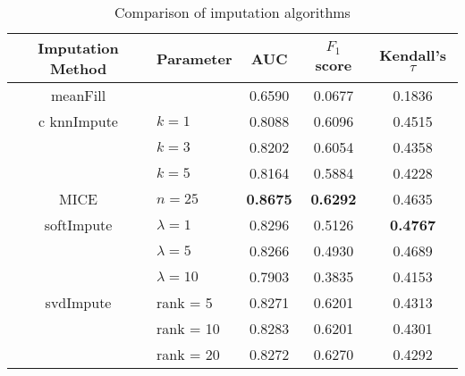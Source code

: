 \begin{table}[htbp]
\centering
\begin{tabular}{cl||ccc}
\toprule
Imputation Method & Parameter & AUC & $F_1$ score & Kendall's $\tau$ \\
\midrule 
meanFill &   & 0.6590  & 0.0677 & 0.1836 \\
\midrule c
knnImpute & $k = 1$ & 0.8088 & 0.6096 & 0.4515\\
  & $k = 3$ & 0.8202 & 0.6054 & 0.4358 \\
  & $k = 5$ & 0.8164 & 0.5884 & 0.4228 \\
\midrule
MICE & $n = 25$ & \bf{0.8675} & \bf{0.6292} & 0.4635 \\
\midrule
softImpute & $\lambda=1$ & 0.8296 & 0.5126 & \bf{0.4767} \\
& $\lambda=5$ & 0.8266 & 0.4930 & 0.4689 \\
& $\lambda=10$ & 0.7903 & 0.3835 & 0.4153 \\
\midrule
svdImpute & rank = 5 & 0.8271 & 0.6201 & 0.4313 \\
& rank = 10 & 0.8283 & 0.6201 & 0.4301 \\
& rank = 20 & 0.8272 & 0.6270 & 0.4292  \\
\bottomrule[1.25pt]
\end{tabular}
\begin{center}
\caption{Comparison of imputation algorithms}
\end{center}
\end{table}

